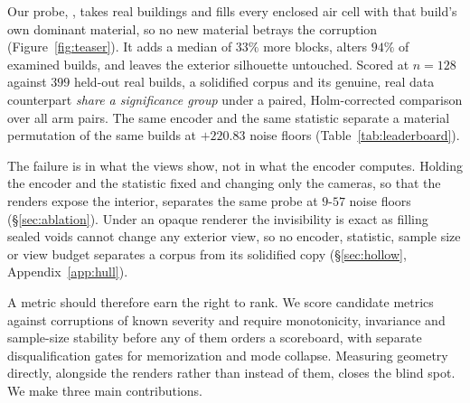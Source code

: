 Our probe, \solidify{}, takes real buildings and fills every enclosed air cell with that build's own dominant material, so no new material betrays the corruption (Figure~\ref{fig:teaser}). It adds a median of $33\%$ more blocks, alters $94\%$ of examined builds, and leaves the exterior silhouette untouched. Scored at $n{=}128$ against $399$ held-out real builds, a solidified corpus and its genuine, real data counterpart \emph{share a significance group} under a paired,  Holm-corrected \citep{holm1979simple} comparison over all arm pairs. The same encoder and the same statistic separate a material permutation of the same builds at $+220.83$ noise floors (Table~\ref{tab:leaderboard}).

The failure is in what the views show, not in what the encoder computes.
Holding the encoder and the statistic fixed and changing only the cameras, so
that the renders expose the interior, separates the same probe at $9$-$57$
noise floors (\S\ref{sec:ablation}). Under an opaque renderer the invisibility
is exact as filling sealed voids cannot change any
exterior view, so no encoder, statistic, sample size or view budget separates a
corpus from its solidified copy (\S\ref{sec:hollow},
Appendix~\ref{app:hull}).

 A metric should therefore earn the right to rank. We score candidate metrics
against corruptions of known severity and require monotonicity, invariance and
sample-size stability before any of them orders a scoreboard, with separate
disqualification gates for memorization and mode collapse. Measuring geometry
directly, alongside the renders rather than instead of them, closes the blind
spot. We make three main contributions.

